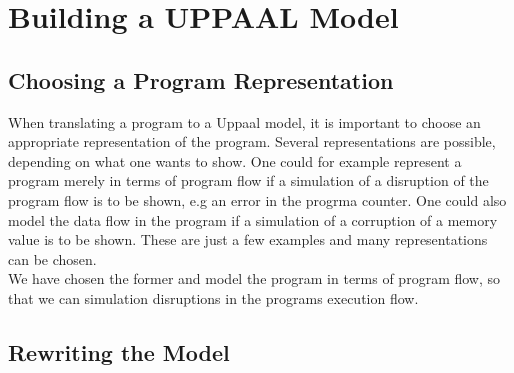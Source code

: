 \chapter{Building a UPPAAL Model}
\section{Choosing a Program Representation}
When translating a program to a Uppaal model, it is important to choose an appropriate representation of the program. Several representations are possible, depending on what one wants to show. One could for example represent a program merely in terms of program flow if a simulation of a disruption of the program flow is to be shown, e.g an error in the progrma counter. One could also model the data flow in the program if a simulation of a corruption of a memory value is to be shown. These are just a few examples and many representations can be chosen.\\

We have chosen the former and model the program in terms of program flow, so that we can simulation disruptions in the programs execution flow. 
\section{Rewriting the Model}